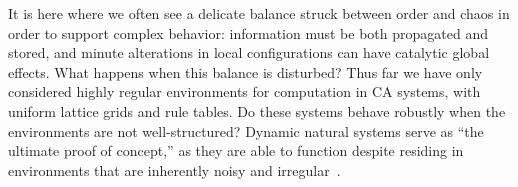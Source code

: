 \documentclass[a4paper,11pt]{article}
\begin{document}

It is here where we often see a delicate balance struck between order and chaos in order to support complex behavior: information must be both propagated and stored, and minute alterations in local configurations can have catalytic global effects. What happens when this balance is disturbed? Thus far we have only considered highly regular environments for computation in CA systems, with uniform lattice grids and rule tables. Do these systems behave robustly when the environments are not well-structured? Dynamic natural systems serve as ``the ultimate proof of concept,'' as they are able to function despite residing in environments that are inherently noisy and irregular~\cite{si99}.


%
%
\end{document}
